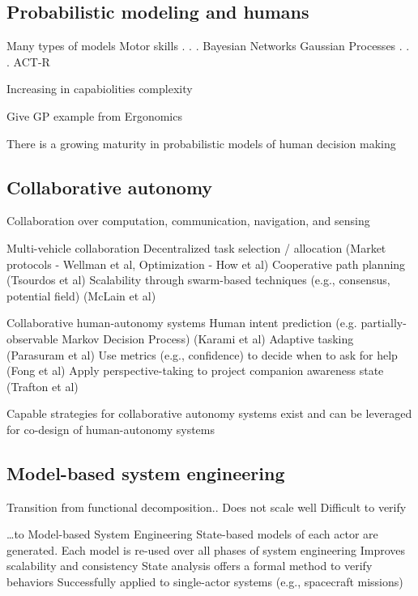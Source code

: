 \documentclass[11pt]{dssg}
\begin{document}
\subsection*{Probabilistic modeling and humans}

Many types of models
Motor skills
     .
     .
     .
Bayesian Networks
Gaussian Processes
     .
     .
     .
ACT-R

Increasing in capabiolities complexity

Give GP example from Ergonomics


There is a growing maturity in probabilistic models of human decision making


\subsection*{Collaborative autonomy}

Collaboration over computation, communication, navigation, and sensing

Multi-vehicle collaboration 
Decentralized task selection / allocation (Market protocols - Wellman et al, Optimization - How et al) 
Cooperative path planning (Tsourdos et al)
Scalability through swarm-based techniques (e.g., consensus, potential field)  (McLain et al)

Collaborative human-autonomy systems
Human intent prediction (e.g. partially-observable Markov Decision Process) (Karami et al)
Adaptive tasking (Parasuram et al)
Use metrics (e.g., confidence) to decide when to ask for help (Fong et al) 
Apply perspective-taking to project companion awareness state (Trafton et al)


Capable strategies for collaborative autonomy systems exist and can be 
leveraged for co-design of human-autonomy systems


\subsection*{Model-based system engineering}
Transition from functional decomposition..
Does not scale well
Difficult to verify


…to Model-based System Engineering 
State-based models of each actor are generated.
Each model is re-used over all phases of system engineering
Improves scalability and consistency
State analysis offers a formal method to verify behaviors
Successfully applied to single-actor systems (e.g., spacecraft missions)



%
\end{document}
